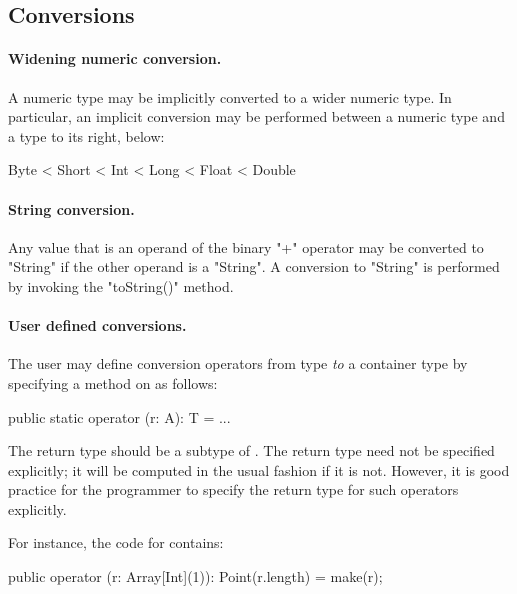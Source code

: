 \subsection{Conversions}

\paragraph{Widening numeric conversion.}
\label{WideningConversions}
A numeric type may be implicitly converted to a wider numeric type. In
particular, an implicit conversion may be performed between a numeric
type and a type to its right, below:

\begin{xten}
Byte < Short < Int < Long < Float < Double
\end{xten}


\paragraph{String conversion.}
Any value that is an operand of the binary
\xcd"+" operator may
be converted to \xcd"String" if the other operand is a \xcd"String".
A conversion to \xcd"String" is performed by invoking the \xcd"toString()"
method.


\paragraph{User defined conversions.}\label{sec:user-defined-conversions}

The user may define conversion operators from type  {\em to} a
container type  by specifying a method on  as follows:

\begin{xten}
  public static operator (r: A): T = ... 
\end{xten}

The return type  should be a subtype of . The return
type need not be specified explicitly; it will be computed in the
usual fashion if it is not. However, it is good practice for the
programmer to specify the return type for such operators explicitly.

For instance, the code for  contains:

\begin{xten}
  public operator (r: Array[Int](1)): Point(r.length) = make(r);
\end{xten}

